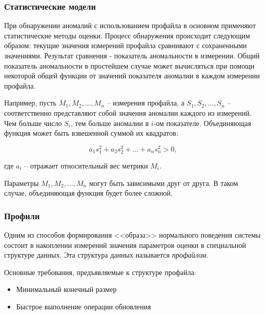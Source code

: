 


\subsubsection{Статистические модели}

При обнаружении аномалий с использованием профайла в основном применяют статистические методы оценки. Процесс обнаружения происходит следующим образом: текущие значения измерений профайла сравнивают с сохраненными значениями. Результат сравнения - показатель аномальности в измерении. Общий показатель аномальности в простейшем случае может вычисляться при помощи некоторой общей функции от значений показателя аномалии в каждом измерении профайла.

Например, пусть $M_1, M_2, \dots, M_n$ -- измерения профайла, а $S_1, S_2, \dots, S_n$ -- соответственно представляют собой значения аномалии каждого из измерений. Чем больше число $S_i$, тем больше аномалии в $i$-ом показателе. Объединяющая функция может быть взвешенной суммой их квадратов:

\begin{equation}
	a_1s_1^2 + a_2s_2^2 + \dots + a_ns_n^2 > 0,
\end{equation}

где $a_i$ -- отражает относительный вес метрики $M_i$.

Параметры $M_1, M_2, \dots, M_n$ могут быть зависимыми друг от друга. В таком случае, объединяющая функция будет более сложной.



\subsubsection{Профили}

Одним из способов формирования <<образа>> нормального поведения системы состоит в накоплении измерений значения параметров оценки в специальной структуре данных. Эта структура данных называется \textit{профайлом}. 

Основные требования, предъявляемые к структуре профайла:
\begin{itemize}
	\item Минимальный конечный размер
	\item Быстрое выполнение операции обновления
\end{itemize}




